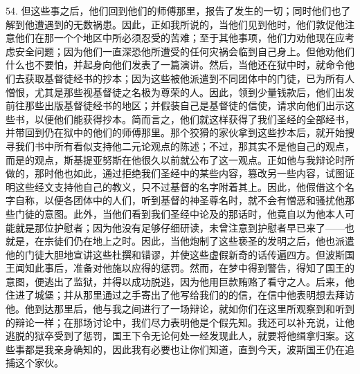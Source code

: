 54. 但这些事之后，他们回到他们的师傅那里，报告了发生的一切；同时他们也了解到他遭遇到的无数祸患。因此，正如我所说的，当他们见到他时，他们敦促他注意他们在那一个个地区中所必须忍受的苦难；至于其他事项，他们力劝他现在应考虑安全问题；因为他们一直深恐他所遭受的任何灾祸会临到自己身上。但他劝他们什么也不要怕，并起身向他们发表了一篇演讲。然后，当他还在狱中时，就命令他们去获取基督徒经书的抄本；因为这些被他派遣到不同团体中的门徒，已为所有人憎恨，尤其是那些视基督徒之名极为尊荣的人。因此，领到少量钱款后，他们出发前往那些出版基督徒经书的地区；并假装自己是基督徒的信使，请求向他们出示这些书，以便他们能获得抄本。简而言之，他们就这样获得了我们圣经的全部经书，并带回到仍在狱中的他们的师傅那里。那个狡猾的家伙拿到这些抄本后，就开始搜寻我们书中所有看似支持他二元论观点的陈述；不过，那其实不是他自己的观点，而是的观点，斯基提亚努斯在他很久以前就公布了这一观点。正如他与我辩论时所做的，那时他也如此，通过拒绝我们圣经中的某些内容，篡改另一些内容，试图证明这些经文支持他自己的教义，只不过基督的名字附着其上。因此，他假借这个名字自称，以便各团体中的人们，听到基督的神圣尊名时，就不会有憎恶和骚扰他那些门徒的意图。此外，当他们看到我们圣经中论及的那话时，他竟自以为他本人可能就是那位护慰者；因为他没有足够仔细研读，未曾注意到护慰者早已来了——也就是，在宗徒们仍在地上之时。因此，当他炮制了这些亵圣的发明之后，他也派遣他的门徒大胆地宣讲这些杜撰和错谬，并使这些虚假新奇的话传遍四方。但波斯国王闻知此事后，准备对他施以应得的惩罚。然而，在梦中得到警告，得知了国王的意图，便逃出了监狱，并得以成功脱逃，因为他用巨款贿赂了看守之人。后来，他住进了城堡；并从那里通过之手寄出了他写给我们的的信，在信中他表明想去拜访他。他到达那里后，他与我之间进行了一场辩论，就如你们在这里所观察到和听到的辩论一样；在那场讨论中，我们尽力表明他是个假先知。我还可以补充说，让他逃脱的狱卒受到了惩罚，国王下令无论何处一经发现此人，就要将他缉拿归案。这些事都是我亲身确知的，因此我有必要也让你们知道，直到今天，波斯国王仍在追捕这个家伙。\par

